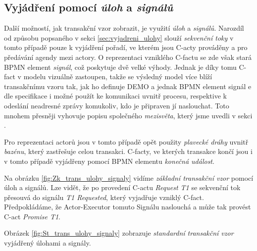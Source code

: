 \documentclass[]{article}
\begin{document}
\subsection{Vyjádření pomocí \textit{úloh} a \textit{signálů}} \label{sec:tr_vzor_ulohy_signaly}

Další možností, jak transakční vzor zobrazit, je využití \textit{úloh} a \textit{signálů}. Narozdíl od způsobu popsaného v sekci \ref{sec:vyjadreni_ulohy} slouží \textit{sekvenční toky} v tomto případě  pouze k vyjádření pořadí, ve kterém jsou C-acty prováděny a pro předávání agendy mezi actory. O reprezentaci vzniklého C-factu se zde však stará BPMN element \textit{signál}, což poskytuje dvě velké výhody. Jednak je díky tomu C-fact v modelu vizuálně zastoupen, takže se výsledný model více blíží transakčnímu vzoru tak, jak ho definuje DEMO a jednak BPMN element signál e dle specifikace \cite{Omg2011} i \cite{Silver2011} možné použít ke komunikaci uvnitř procesu, respektive k odeslání neadresné zprávy komukoliv, kdo je připraven jí naslouchat. Toto mnohem přesněji vyhovuje popisu společného \textit{mezisvěta}, který jsme uvedli v sekci \label{sec:vyjadreni_cfactu}.

Pro reprezentaci actorů jsou v tomto případě opět použity \textit{plavecké dráhy} uvnitř \textit{bazénu}, který zastřešuje celou transakci. C-facty, ve kterých transakce končí jsou i v tomto případě vyjádřeny pomocí BPMN elementu \textit{konečná událost}.

Na obrázku \ref{fig:Zk_trans_ulohy_signaly} vidíme \textit{základní transakční vzor} pomocí úloh a signálů. Lze vidět, že po provedení C-actu \textit{Request T1} se sekvenční tok přesouvá do signálu \textit{T1 Requested}, který vyjadřuje vzniklý C-fact. Předpokládáme, že Actor-Executor tomuto Signálu naslouchá a může tak provést C-act \textit{Promise T1}.

Obrázek \ref{fig:St_trans_ulohy_signaly} zobrazuje \textit{standardní transakční vzor} vyjádřený úlohami a signály.
\end{document}
